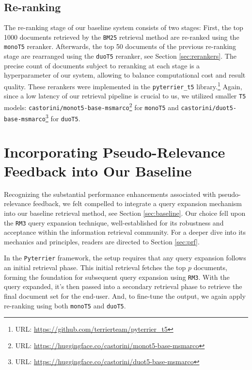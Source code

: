 \documentclass[sigconf]{acmart}
\begin{document}
\subsection{Re-ranking}
The re-ranking stage of our baseline system consists of two stages: First, the top 1000 documents retrieved by the \texttt{BM25} retrieval method are re-ranked using the \texttt{monoT5} reranker. Afterwards, the top 50 documents of the previous re-ranking stage are rearranged using the \texttt{duoT5} reranker, see Section \ref{sec:rerankers}. The precise count of documents subject to reranking at each stage is a hyperparameter of our system, allowing to balance computational cost and result quality. These rerankers were implemented in the \texttt{pyterrier\_t5} library.\footnote{URL: \url{https://github.com/terrierteam/pyterrier_t5}} Again, since a low latency of our retrieval pipeline is crucial to us, we utilized smaller \texttt{T5} models: \texttt{castorini\-/monot5\--base\--msmarco}\footnote{URL: \url{https://huggingface.co/castorini/monot5-base-msmarco}} for \texttt{monoT5} and \texttt{castorini\-/duot5\--base\--msmarco}\footnote{URL: \url{https://huggingface.co/castorini/duot5-base-msmarco}} for \texttt{duoT5}.

\section{Incorporating Pseudo-Relevance Feedback into Our Baseline}\label{sec:baseline+rm3}

Recognizing the substantial performance enhancements associated with pseudo-relevance feedback, we felt compelled to integrate a query expansion mechanism into our baseline retrieval method, see Section \ref{sec:baseline}. Our choice fell upon the \texttt{RM3} query expansion technique, well-established for its robustness and acceptance within the information retrieval community. For a deeper dive into its mechanics and principles, readers are directed to Section \ref{sec:prf}.

In the \texttt{Pyterrier} framework, the setup requires that any query expansion follows an initial retrieval phase. This initial retrieval fetches the top $p$ documents, forming the foundation for subsequent query expansion using \texttt{RM3}. With the query expanded, it's then passed into a secondary retrieval phase to retrieve the final document set for the end-user. And, to fine-tune the output, we again apply re-ranking using both \texttt{monoT5} and \texttt{duoT5}.
\end{document}
